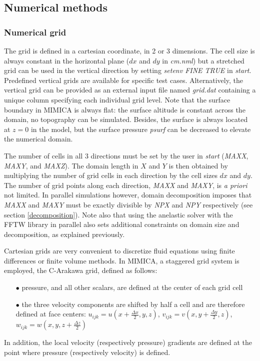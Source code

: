 \documentclass[12pt,A4,french]{article}
\begin{document}
\subsection{Numerical methods}
\label{numerics}

\subsubsection{Numerical grid}

The grid is defined in a cartesian coordinate, in 2 or 3 dimensions. The cell size is always constant in the horizontal plane ($dx$ and $dy$ in {\it cm.nml}) but a stretched grid can be used in the vertical direction by setting {\it setenv FINE TRUE} in {\it start}. Predefined vertical grids are available for specific test cases. Alternatively, the vertical grid can be provided as an external input file named {\it grid.dat} containing a unique column specifying each individual grid level. Note that the surface boundary in MIMICA is always flat: the surface altitude is constant across the domain, no topography can be simulated. Besides, the surface is always located at $z=0$ in the model, but the surface pressure {\it psurf} can be decreased to elevate the numerical domain.

The number of cells in all 3 directions must be set by the user in {\it start} ({\it MAXX}, {\it MAXY}, and {\it MAXZ}). The domain length in $X$ and $Y$ is then obtained by multiplying the number of grid cells in each direction by the cell sizes $dx$ and $dy$. The number of grid points along each direction, {\it MAXX} and {\it MAXY}, is {\it a priori} not limited. In parallel simulations however, domain decomposition imposes that {\it MAXX} and {\it MAXY} must be exactly divisible by {\it NPX} and {\it NPY} respectively (see section \ref{decomposition}). Note also that using the anelastic solver with the FFTW library in parallel also sets additional constraints on domain size and decomposition, as explained previously.

Cartesian grids are very convenient to discretize fluid equations using finite differences or finite volume methods. In MIMICA, a staggered grid system is employed, the C-Arakawa grid, defined as follows:
\begin{itemize}
\item[$\bullet$] pressure, and all other scalars, are defined at the center of each grid cell
\item[$\bullet$] the three velocity components are shifted by half a cell and are therefore defined at face centers: $u_{ijk} = u\left(x+\frac{\Delta x}{2},y,z\right)$, $v_{ijk} = v\left(x,y+\frac{\Delta y}{2},z\right)$, $w_{ijk} = w\left(x,y,z+\frac{\Delta z}{2}\right)$
\end{itemize}
In addition, the local velocity (respectively pressure) gradients are defined at the point where pressure (respectively velocity) is defined.
\end{document}
